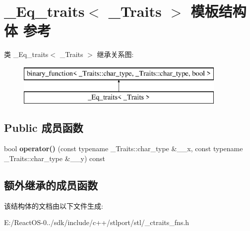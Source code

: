 \hypertarget{struct___eq__traits}{}\section{\+\_\+\+Eq\+\_\+traits$<$ \+\_\+\+Traits $>$ 模板结构体 参考}
\label{struct___eq__traits}
类 \+\_\+\+Eq\+\_\+traits$<$ \+\_\+\+Traits $>$ 继承关系图\+:\begin{figure}[H]
\begin{center}
\leavevmode
\includegraphics[height=2.000000cm]{struct___eq__traits}
\end{center}
\end{figure}
\subsection*{Public 成员函数}
\begin{DoxyCompactItemize}
\item 
\mbox{\label{struct___eq__traits_a4141da6f84a7fa7cc93fd823460139ac}} 
bool {\bfseries operator()} (const typename \+\_\+\+Traits\+::char\+\_\+type \&\+\_\+\+\_\+x, const typename \+\_\+\+Traits\+::char\+\_\+type \&\+\_\+\+\_\+y) const
\end{DoxyCompactItemize}
\subsection*{额外继承的成员函数}


该结构体的文档由以下文件生成\+:\begin{DoxyCompactItemize}
\item 
E\+:/\+React\+O\+S-\/0../sdk/include/c++/stlport/stl/\+\_\+ctraits\+\_\+fns.\+h\end{DoxyCompactItemize}
